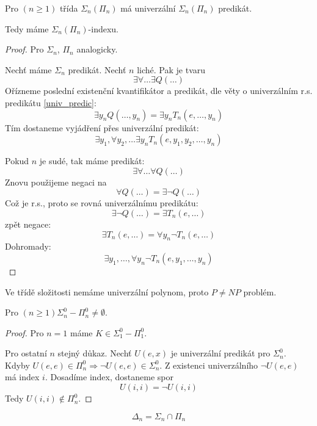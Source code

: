 \begin{theorem}\label{aritm_numer}
	Pro $(n \geq 1)$ třída $\Sigma_n(\Pi_n)$ má univerzální $\Sigma_n(\Pi_n)$ predikát.

	Tedy máme $\Sigma_n(\Pi_n)$-indexu.
\end{theorem}
\begin{proof}
	Pro $\Sigma_n$, $\Pi_n$ analogicky.

	Nechť máme $\Sigma_n$ predikát.
	Nechť $n$ liché. Pak je tvaru
	\[ \exists \forall \ldots \exists Q(\ldots) \]
	Ořízneme poslední existenční kvantifikátor a predikát, dle věty o univerzálním r.s. predikátu \cref{univ_predic}:
	\[ \exists y_n Q(\ldots, y_n) = \exists y_n T_n(e, \ldots, y_n) \]
	Tím dostaneme vyjádření přes univerzální predikát:
	\[ \exists y_1, \forall y_2, \ldots \exists y_n T_n(e, y_1, y_2, \ldots, y_n) \]

	Pokud $n$ je sudé, tak máme predikát:
	\[ \exists \forall \ldots \forall Q(\ldots) \]
	Znovu použijeme negaci na
	\[ \forall Q(\ldots) = \exists \neg Q(\ldots) \]
	Což je r.s., proto se rovná univerzálnímu predikátu:
	\[ \exists \neg Q(\ldots) = \exists T_n(e, \ldots) \]
	zpět negace:
	\[ \exists T_n(e, \ldots) = \forall y_n \neg T_n(e, \ldots) \]
	Dohromady:
	\[ \exists y_1, \ldots, \forall y_n \neg T_n(e, y_1, \ldots, y_n) \]
\end{proof}

\begin{note}
	Ve třídě složitosti nemáme univerzální polynom, proto $P \neq NP$ problém.
\end{note}

\begin{consequence}
	Pro $(n \geq 1) \Sigma_n^0 - \Pi_n^0 \neq \emptyset$.
\end{consequence}
\begin{proof}
	Pro $n = 1$ máme $K \in \Sigma_1^0 - \Pi_1^0$.

	Pro ostatní $n$ stejný důkaz.
	Nechť $U(e, x)$ je univerzální predikát pro $\Sigma_n^0$. Kdyby $U(e, e) \in \Pi_n^0 \Rightarrow \neg U(e, e) \in \Sigma_n^0$.
	Z existenci univerzálního $\neg U(e, e)$ má index $i$.
	Dosadíme index, dostaneme spor
	\[ U(i, i) = \neg U(i, i) \]
	Tedy $U(i, i) \notin \Pi_n^0$.
\end{proof}

\begin{definition}[$\Delta_n$]
	\[ \Delta_n = \Sigma_n \cap \Pi_n \]
\end{definition}

